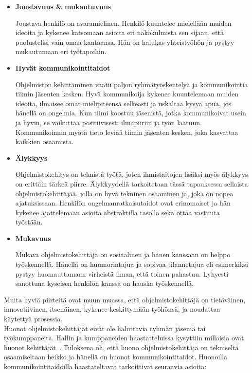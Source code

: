 \documentclass[finnish]{../tktltiki2}
\theoremstyle{definition}
\theoremstyle{remark}
\begin{document}
\begin{itemize}

\item {\bf Joustavuus \& mukautuvuus}

Joustava henkilö on avaramielinen. Henkilö kuuntelee mielellään muiden
ideoita ja kykenee katsomaan asioita eri näkökulmista sen sijaan, että
puolustelisi vain omaa kantaansa. Hän on halukas yhteistyöhön
ja pystyy mukautumaan eri työtapoihin.

\item {\bf Hyvät kommunikointitaidot}

Ohjelmiston kehittäminen vaatii paljon ryhmätyöskentelyä ja
kommunikointia tiimin jäsenten kesken. Hyvä kommunikoija kykenee
kuuntelemaan muiden ideoita, ilmaisee omat mielipiteensä selkeästi ja uskaltaa
kysyä apua, jos hänellä on ongelmia. Kun tiimi koostuu jäsenistä,
jotka kommunikoivat usein ja hyvin, se vaikuttaa positiivisesti
ilmapiiriin ja työn laatuun. Kommunikoinnin myötä
tieto leviää tiimin jäsenten kesken, joka kasvattaa kaikkien osaamista.

\item {\bf Älykkyys}

Ohjelmistokehitys on teknistä työtä, joten
ihmistaitojen lisäksi myös älykkyys on erittäin tärkeä piirre.
Älykkyydellä tarkoitetaan tässä tapauksessa sellaista ohjelmistokehittäjää, jolla on hyvä tekninen osaaminen ja, joka on nopea
ajatuksissaan. Henkilön ongelmanratkaisutaidot ovat erinomaiset
ja hän kykenee ajattelemaan asioita abstraktilla tasolla sekä ottaa
vastuuta työstään.

\item {\bf Mukavuus}

Mukava ohjelmistokehittäjä on sosiaalinen ja hänen kanssaan on
helppo työskennellä. Hänellä on huumorintajua ja sopivaa
tilannetajua eli esimerkiksi pystyy huomauttamaan virheistä ilman,
että toinen pahastuu. Lyhyesti sanottuna kyseisen henkilön kanssa
on hauska työskennellä.

\end{itemize}

Muita hyviä piirteitä ovat muun muassa, että ohjelmistokehittäjä
on tietäväinen, innovatiivinen, itsenäinen, kykenee keskittymään työhönsä, ja noudattaa käytettyä prosessia.\\

Huonot ohjelmistokehittäjät eivät ole haluttavia ryhmän jäseniä tai
työkumppaneita. Hallin ja kumppaneiden haastatteluissa kysyttiin millaisia ovat huonot kehittäjät~\cite{Hall:2007:CNT:1235000.1235043}. Tuloksena oli, että huono ohjelmistokehittäjä on tekniseltä osaamiseltaan heikko ja hänellä on huonot kommunikointitaidot. Huonoilla kommunikointitaidoilla haastateltavat tarkoittivat seuraavia asioita:
\end{document}
